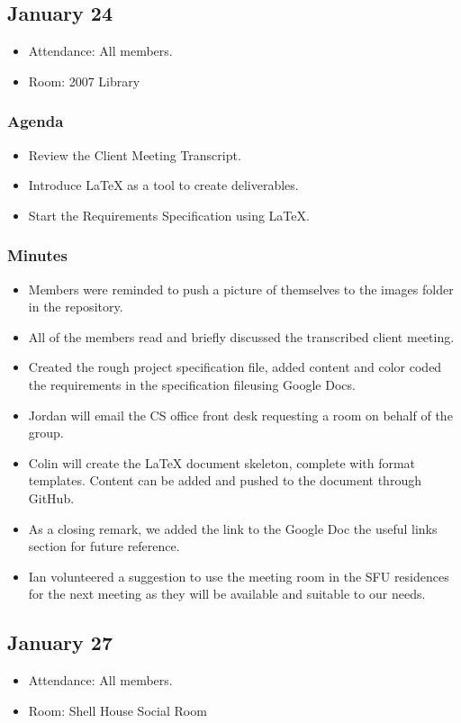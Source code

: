 \documentclass{article}
\begin{document}
\subsection{January 24}
\begin{itemize}
\item Attendance: All members.
\item Room: 2007 Library
\end{itemize}
\subsubsection{Agenda}
\begin{itemize}
\item Review the Client Meeting Transcript.
\item Introduce LaTeX as a tool to create deliverables.
\item Start the Requirements Specification using LaTeX.
\end{itemize}
\subsubsection{Minutes}
\begin{itemize}
\item Members were reminded to push a picture of themselves to the images 
folder in the repository.
\item All of the members read and briefly discussed the transcribed 
client meeting.
\item Created the rough project specification file, added content and color 
coded the requirements in the specification file{using Google Docs}.
\item Jordan will email the CS office front desk requesting a room on behalf
 of the group.
\item Colin will create the LaTeX document skeleton, complete with 
format templates. Content can be added and pushed to
 the document through GitHub.
\item As a closing remark, we added the link to the Google Doc the useful
 links section for future reference. 
\item Ian volunteered a suggestion to use the meeting room in the SFU 
residences for the next meeting as they will be available and 
suitable to our needs.
\end{itemize}

\subsection{January 27}
\begin{itemize}
\item Attendance: All members.
\item Room: Shell House Social Room
\end{itemize}
\end{document}
